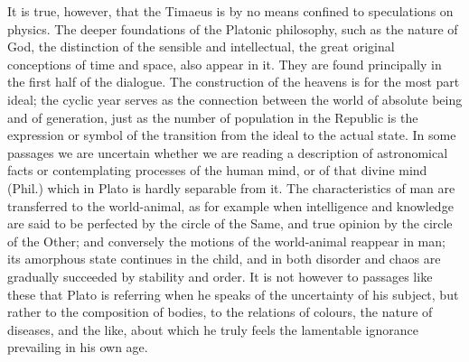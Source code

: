 \documentclass[11pt,letter]{article}
\begin{document}
\par  It is true, however, that the Timaeus is by no means confined to speculations on physics. The deeper foundations of the Platonic philosophy, such as the nature of God, the distinction of the sensible and intellectual, the great original conceptions of time and space, also appear in it. They are found principally in the first half of the dialogue. The construction of the heavens is for the most part ideal; the cyclic year serves as the connection between the world of absolute being and of generation, just as the number of population in the Republic is the expression or symbol of the transition from the ideal to the actual state. In some passages we are uncertain whether we are reading a description of astronomical facts or contemplating processes of the human mind, or of that divine mind (Phil.) which in Plato is hardly separable from it. The characteristics of man are transferred to the world-animal, as for example when intelligence and knowledge are said to be perfected by the circle of the Same, and true opinion by the circle of the Other; and conversely the motions of the world-animal reappear in man; its amorphous state continues in the child, and in both disorder and chaos are gradually succeeded by stability and order. It is not however to passages like these that Plato is referring when he speaks of the uncertainty of his subject, but rather to the composition of bodies, to the relations of colours, the nature of diseases, and the like, about which he truly feels the lamentable ignorance prevailing in his own age.
\end{document}
